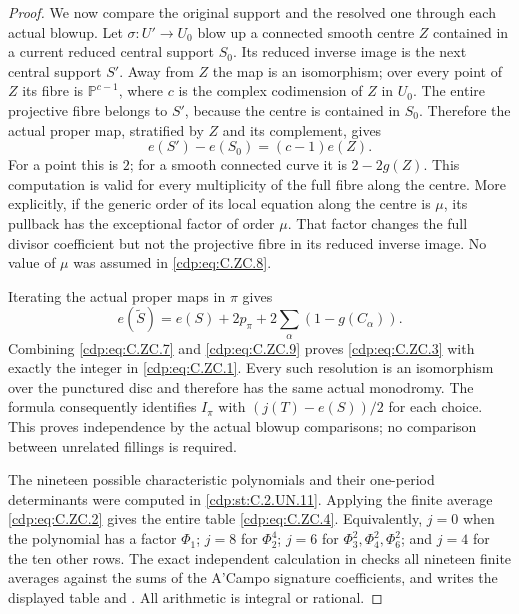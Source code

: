 \begin{proof}
We now compare the original support and
the resolved one through each actual
blowup. Let $\sigma:U'\to U_0$ blow up
a connected smooth centre $Z$ contained
in a current reduced central support
$S_0$. Its reduced inverse image is
the next central support $S'$. Away
from $Z$ the map is an isomorphism;
over every point of $Z$ its fibre is
$\mathbb P^{c-1}$, where $c$ is the
complex codimension of $Z$ in $U_0$.
The entire projective fibre belongs
to $S'$, because the centre is contained
in $S_0$. Therefore the actual proper
map, stratified by $Z$ and its complement,
gives
\[
                    e(S')-e(S_0)=(c-1)e(Z).
                                                               \tag{C.ZC.8}\label{cdp:eq:C.ZC.8}
\]
For a point this is $2$; for a smooth
connected curve it is $2-2g(Z)$.
This computation is valid for every
multiplicity of the full fibre along
the centre. More explicitly, if the
generic order of its local equation
along the centre is $\mu$, its pullback
has the exceptional factor of order
$\mu$. That factor changes the full
divisor coefficient but not the
projective fibre in its reduced
inverse image. No value of $\mu$
was assumed in \eqref{cdp:eq:C.ZC.8}.

Iterating the actual proper maps in
$\pi$ gives
\[
 e(\widetilde S)=e(S)+2p_\pi
                        +2\sum_\alpha(1-g(C_\alpha)).
                                                               \tag{C.ZC.9}\label{cdp:eq:C.ZC.9}
\]
Combining \eqref{cdp:eq:C.ZC.7} and \eqref{cdp:eq:C.ZC.9}
proves \eqref{cdp:eq:C.ZC.3} with exactly the
integer in \eqref{cdp:eq:C.ZC.1}. Every such
resolution is an isomorphism over
the punctured disc and therefore
has the same actual monodromy.
The formula consequently identifies
$I_\pi$ with $(j(T)-e(S))/2$ for
each choice. This proves independence
by the actual blowup comparisons;
no comparison between unrelated
fillings is required.

The nineteen possible characteristic
polynomials and their one-period
determinants were computed in \ref{cdp:st:C.2.UN.11}.
Applying the finite average \eqref{cdp:eq:C.ZC.2}
gives the entire table \eqref{cdp:eq:C.ZC.4}.
Equivalently, $j=0$ when the polynomial
has a factor $\Phi_1$; $j=8$ for
$\Phi_2^4$; $j=6$ for
$\Phi_3^2,\Phi_4^2,\Phi_6^2$;
and $j=4$ for the ten other rows.
The exact independent calculation
in 
checks all nineteen finite averages
against the sums of the A'Campo
signature coefficients, and writes
the displayed table and
.
All arithmetic is integral or rational.


\end{proof}
